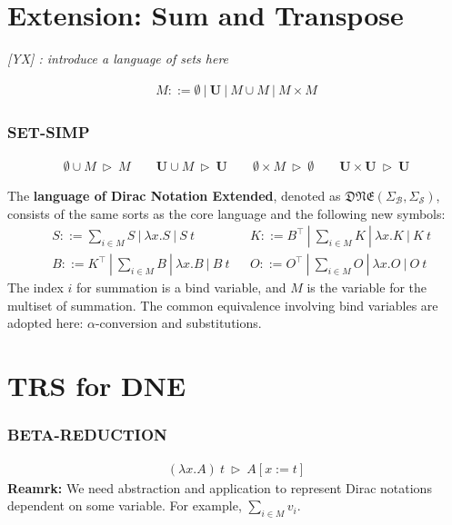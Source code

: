 \documentclass[manuscript, review, timestamp]{acmart}
\newcommand{\yx}[1]{\textit{\color{blue}[YX] : #1}}
\newcommand*{\reduce}{\ \triangleright\ }
\begin{document}

\section{Extension: Sum and Transpose}

\yx{introduce a language of sets here}

\begin{definition}[set]
  \begin{align*}
    M ::= \emptyset\ |\ \mathbf{U}\ |\ M \cup M\ |\ M \times M
  \end{align*}
\end{definition}

\subsubsection*{\textsf{SET-SIMP}}
\begin{gather*}
  \emptyset \cup M \reduce M
  \qquad
  \mathbf{U} \cup M \reduce \mathbf{U}
  \qquad
  \emptyset \times M \reduce \emptyset
  \qquad
  \mathbf{U} \times \mathbf{U} \reduce \mathbf{U}
\end{gather*}

\begin{definition}[DNE]
    The \textbf{language of Dirac Notation Extended}, denoted as $\mathfrak{DNE}(\Sigma_\mathcal{B}, \Sigma_\mathcal{S})$, consists of the same sorts as the core language and the following new symbols:
    \begin{align*}
        & S ::= \sum_{i \in M} S\ |\ \lambda x.S\ |\ S\ t && K ::= B^\top\ |\ \sum_{i \in M} K\ |\ \lambda x.K\ |\ K\ t \\
        & B ::= K^\top\ |\ \sum_{i \in M} B\ |\ \lambda x.B\ |\ B\ t && O ::= O^\top\ |\ \sum_{i \in M} O\ |\ \lambda x.O\ |\ O\ t
    \end{align*}
    The index $i$ for summation is a bind variable, and $M$ is the variable for the multiset of summation. The common equivalence involving bind variables are adopted here: $\alpha$-conversion and substitutions.
\end{definition}

\section{TRS for DNE}

\subsubsection*{\textsf{BETA-REDUCTION}}
\begin{gather*}
  (\lambda x.A)\ t \reduce A[x:=t]
\end{gather*}
\textbf{Reamrk:} We need abstraction and application to represent Dirac notations dependent on some variable. For example, $\sum_{i \in M} v_i$.
\end{document}
